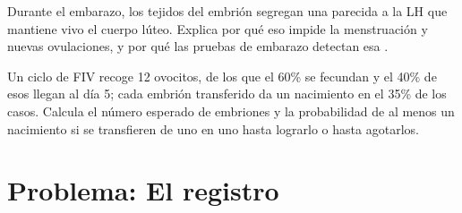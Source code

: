 \begin{exercise}[$\star\star\star$]\label{exo:g11:hormones-and-reproduction:14}
Durante el embarazo, los tejidos del embrión segregan una 
parecida a la LH que mantiene vivo el cuerpo lúteo. Explica por qué eso
impide la menstruación y nuevas ovulaciones, y por qué las pruebas de
embarazo detectan esa .
\end{exercise}

\begin{exercise}[$\star\star\star$]\label{exo:g11:hormones-and-reproduction:15}
Un ciclo de FIV recoge 12 ovocitos, de los que el 60\% se fecundan y el
40\% de esos llegan al día 5; cada embrión transferido da un nacimiento
en el 35\% de los casos. Calcula el número esperado de embriones y la
probabilidad de al menos un nacimiento si se transfieren de uno en uno
hasta lograrlo o hasta agotarlos.
\end{exercise}

\section{Problema: El registro}

